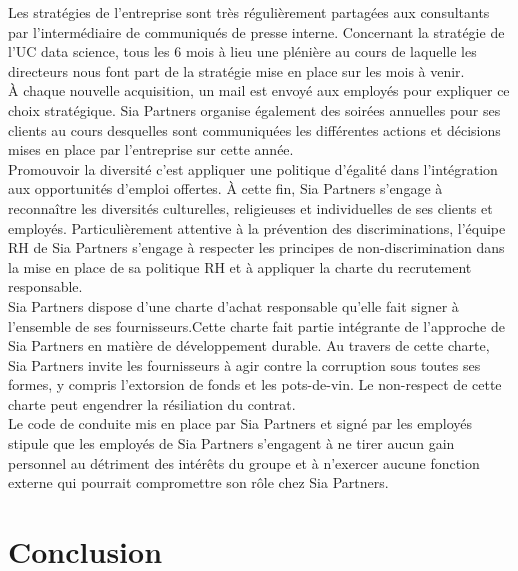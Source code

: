 \documentclass{article} %
\begin{document}
Les stratégies de l’entreprise sont très régulièrement partagées aux consultants par l’intermédiaire de communiqués de presse interne. Concernant la stratégie de l’UC data science, tous les 6 mois à lieu une plénière au cours de laquelle les directeurs nous font part de la stratégie mise en place sur les mois à venir.\\

À chaque nouvelle acquisition, un mail est envoyé aux employés pour expliquer ce choix stratégique. Sia Partners organise également des soirées annuelles pour ses clients au cours desquelles sont communiquées les différentes actions et décisions mises en place par l’entreprise sur cette année.\\

Promouvoir la diversité c’est appliquer une politique d’égalité dans l’intégration aux opportunités d’emploi offertes. À cette fin, Sia Partners s’engage à reconnaître les diversités culturelles, religieuses et individuelles de ses clients et employés.  Particulièrement attentive à la prévention des discriminations, l’équipe RH de Sia Partners s’engage à respecter les principes de non-discrimination dans la mise en place de sa politique RH et à appliquer la charte du recrutement responsable.\\

Sia Partners dispose d’une charte d’achat responsable qu’elle fait signer à l’ensemble de ses fournisseurs.Cette charte fait partie intégrante de l’approche de Sia Partners en matière de développement durable. Au travers de cette charte, Sia Partners invite les fournisseurs à agir contre la corruption sous toutes ses formes, y compris l’extorsion de fonds et les pots-de-vin. Le non-respect de cette charte peut engendrer la résiliation du contrat.\\

Le code de conduite mis en place par Sia Partners et signé par les employés stipule que les employés de Sia Partners s’engagent à ne tirer aucun gain personnel au détriment des intérêts du groupe et à n’exercer aucune fonction externe qui pourrait compromettre son rôle chez Sia Partners.


\newpage

\section{Conclusion}
\end{document}
